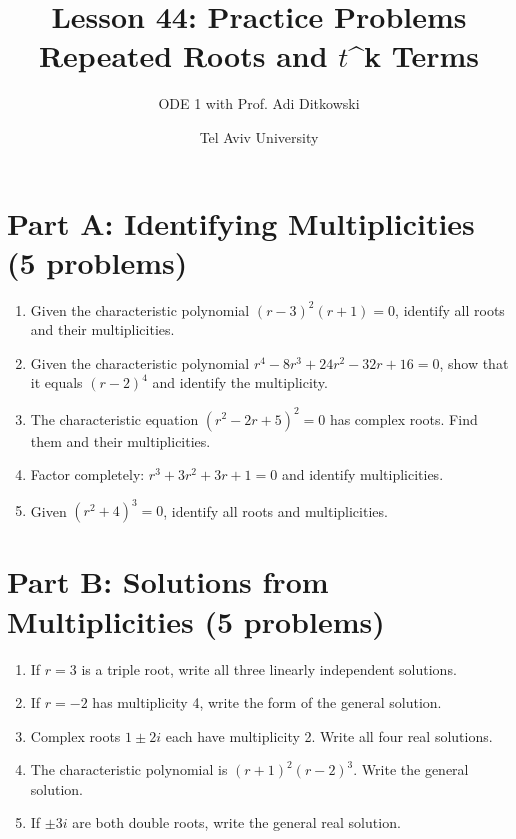 \documentclass[12pt]{article}
\title{Lesson 44: Practice Problems\\Repeated Roots and $t$^{k}$$ Terms}
\author{ODE 1 with Prof. Adi Ditkowski}
\date{Tel Aviv University}
\begin{document}
\maketitle

\section*{Part A: Identifying Multiplicities (5 problems)}

\begin{enumerate}
\item Given the characteristic polynomial $(r-3)^{2}(r+1) = 0$, identify all roots and their multiplicities.

\item Given the characteristic polynomial $r^{4} - 8r^{3} + 24r^{2} - 32r + 16 = 0$, show that it equals $(r-2)^{4}$ and identify the multiplicity.

\item The characteristic equation $(r^{2} - 2r + 5)^{2} = 0$ has complex roots. Find them and their multiplicities.

\item Factor completely: $r^{3} + 3r^{2} + 3r + 1 = 0$ and identify multiplicities.

\item Given $(r^{2} + 4)^{3} = 0$, identify all roots and multiplicities.
\end{enumerate}

\section*{Part B: Solutions from Multiplicities (5 problems)}

\begin{enumerate}[resume]
\item If $r = 3$ is a triple root, write all three linearly independent solutions.

\item If $r = -2$ has multiplicity 4, write the form of the general solution.

\item Complex roots $1 \pm 2i$ each have multiplicity 2. Write all four real solutions.

\item The characteristic polynomial is $(r+1)^{2}(r-2)^{3}$. Write the general solution.

\item If $\pm 3i$ are both double roots, write the general real solution.
\end{enumerate}
\end{document}
